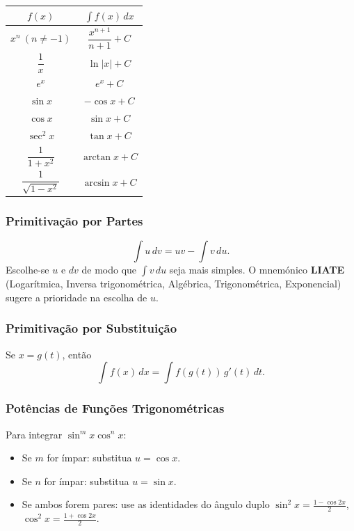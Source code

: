 \begin{center}
\renewcommand{\arraystretch}{1.5}
\begin{tabular}{cc}
  \toprule
  $f(x)$ & $\displaystyle\int f(x)\,dx$ \\
  \midrule
  $x^n\ (n\neq-1)$ & $\dfrac{x^{n+1}}{n+1}+C$ \\[6pt]
  $\dfrac{1}{x}$ & $\ln|x|+C$ \\[6pt]
  $e^x$ & $e^x+C$ \\[6pt]
  $\sin x$ & $-\cos x+C$ \\[6pt]
  $\cos x$ & $\sin x+C$ \\[6pt]
  $\sec^2 x$ & $\tan x+C$ \\[6pt]
  $\dfrac{1}{1+x^2}$ & $\arctan x + C$ \\[6pt]
  $\dfrac{1}{\sqrt{1-x^2}}$ & $\arcsin x + C$ \\
  \bottomrule
\end{tabular}
\end{center}

\subsubsection*{Primitivação por Partes}

\begin{thmbox}[title={Fórmula de Primitivação por Partes}]
\[
  \int u\,dv = uv - \int v\,du.
\]
Escolhe-se $u$ e $dv$ de modo que $\int v\,du$ seja mais simples. O
mnemónico \textbf{LIATE} (Logarítmica, Inversa trigonométrica, Algébrica,
Trigonométrica, Exponencial) sugere a prioridade na escolha de $u$.
\end{thmbox}

\subsubsection*{Primitivação por Substituição}

\begin{thmbox}[title={Fórmula de Substituição}]
Se $x = g(t)$, então
\[
  \int f(x)\,dx = \int f(g(t))\,g'(t)\,dt.
\]
\end{thmbox}

\subsubsection*{Potências de Funções Trigonométricas}

Para integrar $\sin^m x\cos^n x$:
\begin{itemize}
  \item Se $m$ for ímpar: substitua $u=\cos x$.
  \item Se $n$ for ímpar: substitua $u=\sin x$.
  \item Se ambos forem pares: use as identidades do ângulo duplo
        $\sin^2 x = \tfrac{1-\cos 2x}{2}$,
        $\cos^2 x = \tfrac{1+\cos 2x}{2}$.
\end{itemize}

